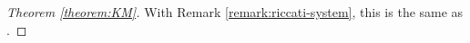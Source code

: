 \begin{proof}[Theorem \ref{theorem:KM}]
  With Remark \ref{remark:riccati-system}, this is the same as \cite[Theorem 2.14]{keller2015}.
\end{proof}
